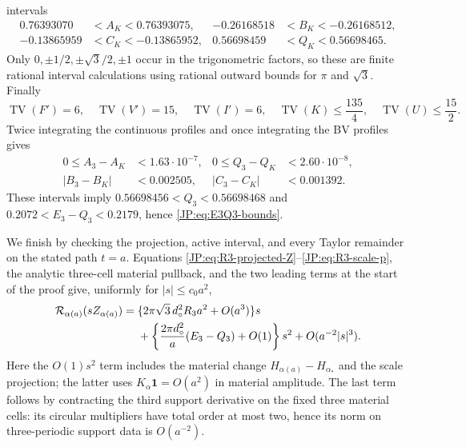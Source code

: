\documentclass[11pt]{amsart}
\providecommand{\mathscr}{\mathcal}
\numberwithin{equation}{section}
\theoremstyle{definition}
\theoremstyle{remark}
\providecommand{\mathscr}[1]{\mathcal{#1}}
\begin{document}
intervals
\[
\begin{aligned}
0.76393070&<A_K<0.76393075,&
-0.26168518&<B_K<-0.26168512,\\
-0.13865959&<C_K<-0.13865952,&
0.56698459&<Q_K<0.56698465.
\end{aligned}
\]
Only $0,\pm1/2,\pm\sqrt3/2,\pm1$ occur in the trigonometric factors, so
these are finite rational interval calculations using rational outward
bounds for $\pi$ and $\sqrt3$.  Finally
\[
\operatorname {TV}(F')=6,\quad \operatorname {TV}(V')=15,\quad
\operatorname {TV}(I')=6,\quad
\operatorname {TV}(K)\le\frac{135}{4},\quad
\operatorname {TV}(U)\le\frac{15}{2}.
\]
Twice integrating the continuous profiles and once integrating the BV
profiles gives
\[
\begin{aligned}
0\le A_3-A_K&<1.63\cdot10^{-7},&
0\le Q_3-Q_K&<2.60\cdot10^{-8},\\
|B_3-B_K|&<0.002505,&
|C_3-C_K|&<0.001392.
\end{aligned}
\]
These intervals imply
$0.56698456<Q_3<0.56698468$ and
$0.2072<E_3-Q_3<0.2179$, hence
\eqref{JP:eq:E3Q3-bounds}.

We finish by checking the projection, active interval, and every Taylor
remainder on the stated path $t=a$.  Equations
\eqref{JP:eq:R3-projected-Z}--\eqref{JP:eq:R3-scale-p}, the analytic
three-cell material pullback, and the two leading terms at the start of
the proof give, uniformly for $|s|\le c_0a^2$,
\begin{align}
 \mathscr R_{\alpha(a)}(sZ_{\alpha(a)})
 ={}&
 \{2\pi\sqrt3\,d_\circ^2R_3a^2+O(a^3)\}s\notag\\
 &+\left\{\frac{2\pi d_\circ^2}{a}(E_3-Q_3)+O(1)\right\}s^2
 +O(a^{-2}|s|^3).
 \label{JP:eq:joint-period3-Taylor}
\end{align}
Here the $O(1)s^2$ term includes the material change
$H_{\alpha(a)}-H_{\alpha_*}$ and the scale projection; the latter uses
$K_\alpha\mathbf1=O(a^2)$ in material amplitude.  The last term follows
by contracting the third support derivative on the fixed three material
cells: its circular multipliers have total order at most two, hence its
norm on three-periodic support data is $O(a^{-2})$.
\end{document}

